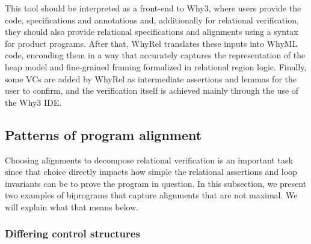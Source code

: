\iffalse
To ensure that clients of modules respect encapsulation, WhyRel performs an analysis
on source programs. This analysis includes two parts: a static check to ensure client
programs don’t directly write to variables in a module’s boundary; and the generation
of intermediate assertions that express disjointness between the footprints of client heap
updates and regions demarcated by module boundaries. An example is given in Fig. 13.
For modules with public/private invariants, WhyRel additionally generates a lemma
which states that the module’s boundary frames the invariant, i.e., the invariant only
depends on locations expressed by the boundary. The same is done with coupling
relations, for which we need to consider boundaries of both modules being related. A
technical condition of relational region logic requiring boundaries grow monotonically
as computation proceeds is also ensured by introducing appropriate postconditions in
generated programs.
\fi

This tool should be interpreted as a front-end to Why3, where users provide the code, specifications and annotations and, additionally for relational verification, they should also provide relational specifications and alignments using a syntax for product programs.
After that, WhyRel translates these inputs into WhyML code, enconding them in a way that accurately captures the representation of the heap model and fine-grained framing formalized in relational region logic.
Finally, some VCs are added by WhyRel as intermediate assertions and lemmas for the user to confirm, and the verification itself is achieved mainly through the use of the Why3 IDE.




\subsection{Patterns of program alignment}
\label{subsec:whyrel_patterns}

Choosing alignments to decompose relational verification is an important task since that choice directly impacts how simple the relational assertions and loop invariants can be to prove the program in question.
In this subsection, we present two examples of biprograms that capture alignments that are not maximal.
We will explain what that means below.


\subsubsection{Differing control structures}
\label{subsubsec:diff_control_structs}


